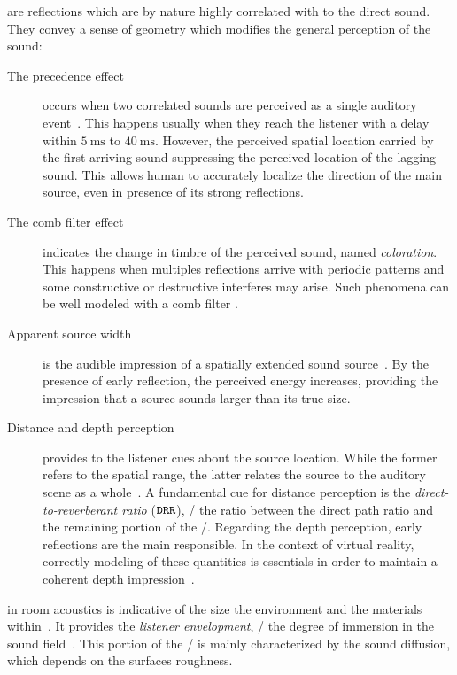  are reflections which are by nature highly correlated with to the direct sound.
They convey a sense of geometry which modifies the general perception of the sound:
\begin{description}
    \item[The precedence effect] occurs when two correlated sounds are perceived as a single auditory event~.
    This happens usually when they reach the listener with a delay within $\SI{5}{\ms}$ to $\SI{40}{\ms}$.
    However, the perceived spatial location carried by the first-arriving sound suppressing the perceived location of the lagging sound.
    This allows human to accurately localize the direction of the main source, even in presence of its strong reflections.
    \item[The comb filter effect] indicates the change in timbre of the perceived sound, named \textit{coloration}.
    This happens when multiples reflections arrive with periodic patterns and some constructive or destructive interferes may arise.
    Such phenomena can be well modeled with a comb filter .
    \item[Apparent source width] is the audible impression of a spatially extended sound source~.
    By the presence of early reflection, the perceived energy increases, providing the impression that a source sounds larger than its true size.
    \item[Distance and depth perception] provides to the listener cues about the source location.
    While the former refers to the spatial range, the latter relates the source to the auditory scene as a whole~.
    A fundamental cue for distance perception is the \textit{direct-to-reverberant ratio} ($\mathtt{DRR}$),
    \ie/ the ratio between the direct path ratio and the remaining portion of the \RIR/.
    Regarding the depth perception, early reflections are the main responsible.
    In the context of virtual reality, correctly modeling of these quantities is essentials in order to maintain a coherent depth impression~.
\end{description}

 in room acoustics is indicative of the size the environment and the materials within~.
It provides the \textit{listener envelopment}, \ie/ the degree of immersion in the sound field~.
This portion of the \RIR/ is mainly characterized by the sound diffusion, which depends on the surfaces roughness.

